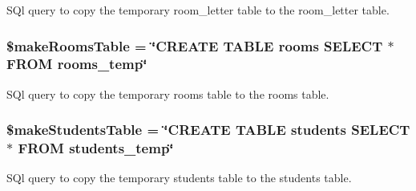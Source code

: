 \-S\-Ql query to copy the temporary room\-\_\-letter table to the room\-\_\-letter table. \hypertarget{saveChanges_8php_a5a8d87069cd729a066d0e7884c9cbe8d}{
\subsubsection[{\$make\-Rooms\-Table}]{\setlength{\rightskip}{0pt plus 5cm}\$make\-Rooms\-Table = \char`\"{}\-C\-R\-E\-A\-T\-E \-T\-A\-B\-L\-E rooms \-S\-E\-L\-E\-C\-T $\ast$ \-F\-R\-O\-M rooms\-\_\-temp\char`\"{}}}\label{saveChanges_8php_a5a8d87069cd729a066d0e7884c9cbe8d}
\-S\-Ql query to copy the temporary rooms table to the rooms table. \hypertarget{saveChanges_8php_abfc3a70bbc2069601691a0ef55e48339}{
\subsubsection[{\$make\-Students\-Table}]{\setlength{\rightskip}{0pt plus 5cm}\$make\-Students\-Table = \char`\"{}\-C\-R\-E\-A\-T\-E \-T\-A\-B\-L\-E students \-S\-E\-L\-E\-C\-T $\ast$ \-F\-R\-O\-M students\-\_\-temp\char`\"{}}}\label{saveChanges_8php_abfc3a70bbc2069601691a0ef55e48339}
\-S\-Ql query to copy the temporary students table to the students table. 